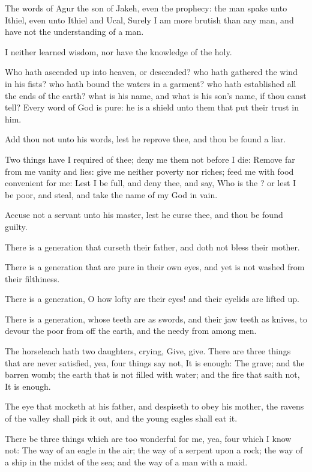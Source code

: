 \Chapter
\Verse The words of Agur the son of Jakeh, even the prophecy: the man spake unto Ithiel, even unto Ithiel and Ucal, \Verse Surely I am more brutish than any man, and have not the understanding of a man.

\Verse I neither learned wisdom, nor have the knowledge of the holy.

\Verse Who hath ascended up into heaven, or descended? who hath gathered the wind in his fists? who hath bound the waters in a garment? who hath established all the ends of the earth? what is his name, and what is his son's name, if thou canst tell?  \Verse Every word of God is pure: he is a shield unto them that put their trust in him.

\Verse Add thou not unto his words, lest he reprove thee, and thou be found a liar.

\Verse Two things have I required of thee; deny me them not before I die: \Verse Remove far from me vanity and lies: give me neither poverty nor riches; feed me with food convenient for me: \Verse Lest I be full, and deny thee, and say, Who is the \LORD? or lest I be poor, and steal, and take the name of my God in vain.

\Verse Accuse not a servant unto his master, lest he curse thee, and thou be found guilty.

\Verse There is a generation that curseth their father, and doth not bless their mother.

\Verse There is a generation that are pure in their own eyes, and yet is not washed from their filthiness.

\Verse There is a generation, O how lofty are their eyes! and their eyelids are lifted up.

\Verse There is a generation, whose teeth are as swords, and their jaw teeth as knives, to devour the poor from off the earth, and the needy from among men.

\Verse The horseleach hath two daughters, crying, Give, give. There are three things that are never satisfied, yea, four things say not, It is enough: \Verse The grave; and the barren womb; the earth that is not filled with water; and the fire that saith not, It is enough.

\Verse The eye that mocketh at his father, and despiseth to obey his mother, the ravens of the valley shall pick it out, and the young eagles shall eat it.

\Verse There be three things which are too wonderful for me, yea, four which I know not: \Verse The way of an eagle in the air; the way of a serpent upon a rock; the way of a ship in the midst of the sea; and the way of a man with a maid.


